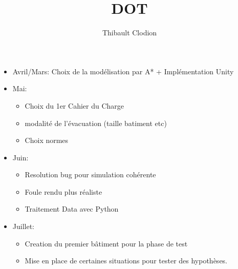 \documentclass[12pt]{article}
\title{DOT}
\author{Thibault Clodion}
\begin{document}
\maketitle %


\begin{itemize}
    \item Avril/Mars: Choix de la modélisation par A* + Implémentation Unity
    \item Mai: 
    \begin{itemize}
        \item Choix du 1er Cahier du Charge
        \item modalité de l’évacuation (taille batiment etc)
        \item Choix normes
    \end{itemize}
    \item Juin: 
    \begin{itemize}
        \item Resolution bug pour simulation cohérente
        \item Foule rendu plus réaliste
        \item Traitement Data avec Python
    \end{itemize}
    \item Juillet: 
    \begin{itemize}
        \item Creation du premier bâtiment pour la phase de test
        \item Mise en place de certaines situations pour tester des hypothèses.
    \end{itemize}
\end{itemize}
\end{document}

